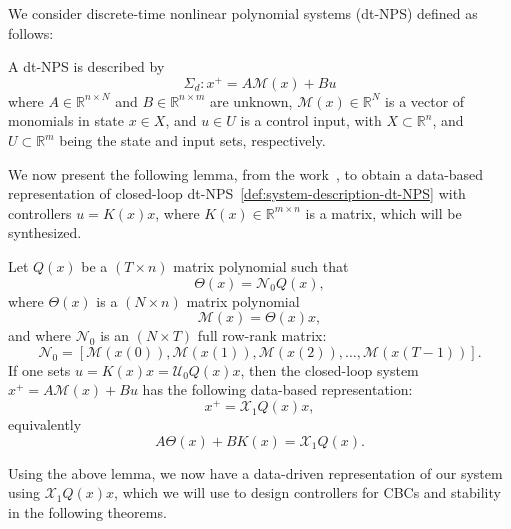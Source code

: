 \documentclass[sigconf]{acmart}
\begin{document}
We consider discrete-time nonlinear polynomial systems (dt-NPS) defined as follows:

\begin{definition}
\label{def:system-description-dt-NPS}
A dt-NPS is described by
\begin{equation}
\label{eq:dt-NPS}
\Sigma_d: x^+ = A\mathcal{M}(x)+Bu
\end{equation}
where $A\in\mathbb{R}^{n\times N}$ and $B\in\mathbb{R}^{n\times m}$ are unknown, $\mathcal{M}(x)\in\mathbb{R}^N$ is a vector of monomials in state $x\in X$, and $u\in U$ is a control input, with $X\subset\mathbb{R}^n$, and $U\subset\mathbb{R}^m$ being the state and input sets, respectively.
\end{definition}

We now present the following lemma, from the work~\cite{samari2024singletrajectory}, to obtain a data-based representation of closed-loop dt-NPS~\eqref{def:system-description-dt-NPS} with controllers $u=K(x)x$, where $K(x)\in\mathbb{R}^{m\times n}$ is a matrix, which will be synthesized.

\begin{lemma}
\label{lem:Q-dtNPS}
Let $Q(x)$ be a $(T\times n)$ matrix polynomial such that
\begin{equation}
\label{eq:nonlinear-theta=NQ}
\Theta(x) = \mathcal{N}_{0}Q(x),
\end{equation}
where $\Theta(x)$ is a $(N\times n)$ matrix polynomial
\begin{equation}
\label{eq:nonlinear-M=thetax}
\mathcal{M}(x)=\Theta(x)x,
\end{equation}
and where $\mathcal{N}_{0}$ is an $(N\times T)$ full row-rank matrix:
\begin{equation}
\label{eq:data-N0T-dt}
\mathcal{N}_{0} = [\mathcal{M}(x(0)), \mathcal{M}(x(1)), \mathcal{M}(x(2)), \ldots, \mathcal{M}(x(T-1))].
\end{equation} If one sets $u=K(x)x = \mathcal{U}_{0}Q(x)x$, then the closed-loop system $x^+=A\mathcal{M}(x)+Bu$ has the following data-based representation:
\begin{equation*}
x^+ = \mathcal{X}_{1}Q(x)x,
\end{equation*}
equivalently
\begin{equation}
\label{eq:nonlinearA+BK=X1TQ}
A\Theta(x)+BK(x) = \mathcal{X}_{1}Q(x).
\end{equation}
\end{lemma}

Using the above lemma, we now have a data-driven representation of our system using $\mathcal{X}_{1}Q(x)x$, which we will use to design controllers for CBCs and stability in the following theorems.
\end{document}
